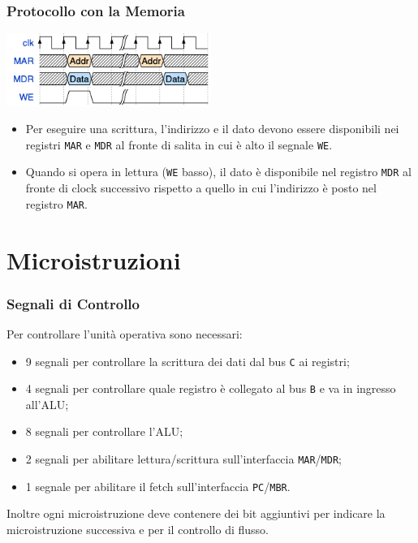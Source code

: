 \documentclass{beamer}
\begin{document}
\begin{frame}
  \frametitle{Protocollo con la Memoria}
  \begin{center}
    \includegraphics[width=0.5\textwidth]{mem_prot.png}
  \end{center}
  \begin{itemize}
    \item Per eseguire una scrittura, l'indirizzo e il dato devono essere
    disponibili nei registri \lstinline{MAR} e \lstinline{MDR} al fronte di
    salita in cui è alto il segnale \lstinline{WE}.
    \item Quando si opera in lettura (\lstinline{WE} basso), il dato è
    disponibile nel registro \lstinline{MDR} al fronte di clock successivo
    rispetto a quello in cui l'indirizzo è posto nel registro \lstinline{MAR}.
  \end{itemize}
\end{frame}

\section{Microistruzioni}
\begin{frame}
  \frametitle{Segnali di Controllo}
  Per controllare l'unità operativa sono necessari:
  \begin{itemize}
    \item 9 segnali per controllare la scrittura dei dati dal bus \lstinline{C}
    ai registri;
    \item 4 segnali per controllare quale registro è collegato al bus
    \lstinline{B} e va in ingresso all'ALU;
    \item 8 segnali per controllare l'ALU;
    \item 2 segnali per abilitare lettura/scrittura sull'interfaccia
    \lstinline{MAR}/\lstinline{MDR};
    \item 1 segnale per abilitare il fetch sull'interfaccia
    \lstinline{PC}/\lstinline{MBR}.
  \end{itemize}
  Inoltre ogni microistruzione deve contenere dei bit aggiuntivi per indicare la
  microistruzione successiva e per il controllo di flusso.
\end{frame}
\end{document}
